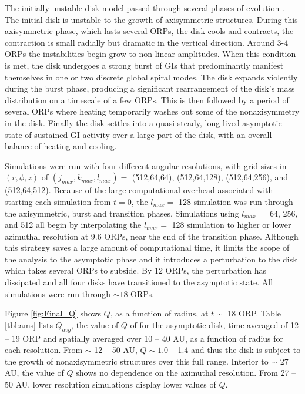 \documentclass[manuscript]{aastex} %
\begin{document}
The initially unstable disk model passed through several phases of evolution \citep[see also][]{pickett2003, mejia2005}.  The initial disk is unstable to the growth of axisymmetric structures. During this axisymmetric phase, 
which lasts several ORPs, the disk cools and contracts, the contraction is small radially but dramatic in the vertical direction. Around 3-4 ORPs the instabilities begin grow to non-linear amplitudes. When this condition is met, the disk undergoes a strong burst of GIs that predominantly manifest themselves in one or two discrete global spiral modes.  The disk expands violently during the burst phase, producing a significant rearrangement of the disk's mass distribution on a timescale of a few ORPs. This is then followed by a period of several ORPs where heating temporarily washes out some of the nonaxisymmetry in the disk.  Finally the disk settles into a quasi-steady, long-lived asymptotic state of sustained GI-activity over a large part of the disk, with an overall balance of heating and cooling.

Simulations were run with four different angular resolutions, with grid sizes in $(r,\phi,z)$ of  $(j_{max}, k_{max}, l_{max}) =$ (512,64,64), (512,64,128), (512,64,256), and (512,64,512). Because of the large computational overhead associated with starting each simulation from $t = 0$, the $l_{max} =$ 128 simulation was run through the axisymmetric, burst and transition phases. Simulations using $l_{max} =$ 64, 256, and 512 all begin by interpolating the $l_{max} =$ 128 simulation to higher or lower azimuthal resolution at 9.6 ORPs, near the end of the transition
phase. Although this strategy saves a large amount of computational time, it limits the scope of the analysis to the asymptotic phase and it introduces a perturbation to the disk which takes several ORPs to subside. By 12 ORPs, the perturbation has dissipated and all four disks have transitioned to the asymptotic state.  All simulations were 
run through $\sim 18$ ORPs.

Figure 
\ref{fig:Final_Q} 
shows $Q$, as a function of radius, at $t \sim$ 18 ORP.  Table \ref{tbl:ams} lists $Q_{avg}$, the value of $Q$ of for the asymptotic disk, time-averaged of 12 -- 19 ORP and spatially averaged over 10 -- 40 AU, as a function of radius for each resolution.  From $\sim$ 12 -- 50 AU, $Q \sim 1.0$ -- 1.4 and thus the disk is subject to the growth of nonaxisymmetric structures over this full range.  Interior to $\sim$ 27 AU, the value of $Q$ shows no dependence on
the azimuthal resolution.  From 27 -- 50 AU, lower resolution simulations display lower values of $Q$.  
\end{document}

